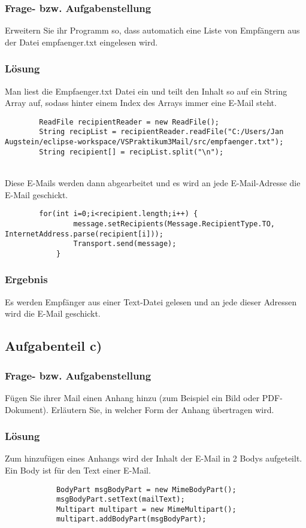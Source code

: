 \subsubsection{Frage- bzw. Aufgabenstellung}
 Erweitern Sie ihr Programm so, dass automatich eine Liste von Empfängern aus der Datei empfaenger.txt eingelesen wird.
 
\subsubsection{Lösung}
Man liest die Empfaenger.txt Datei ein und teilt den Inhalt so auf ein String Array auf, sodass hinter einem Index des Arrays immer eine E-Mail steht. 
\begin{lstlisting}
		ReadFile recipientReader = new ReadFile();
		String recipList = recipientReader.readFile("C:/Users/Jan Augstein/eclipse-workspace/VSPraktikum3Mail/src/empfaenger.txt");
		String recipient[] = recipList.split("\n");
\end{lstlisting} 
\\

Diese E-Mails werden dann abgearbeitet und es wird an jede E-Mail-Adresse die E-Mail geschickt.
\begin{lstlisting}
		for(int i=0;i<recipient.length;i++) {
				message.setRecipients(Message.RecipientType.TO, InternetAddress.parse(recipient[i]));
				Transport.send(message);
			}
\end{lstlisting}

\subsubsection{Ergebnis}
Es werden Empfänger aus einer Text-Datei gelesen und an jede dieser Adressen wird die E-Mail geschickt.

\subsection{Aufgabenteil c)}
\subsubsection{Frage- bzw. Aufgabenstellung}
 Fügen Sie ihrer Mail einen Anhang hinzu (zum Beispiel ein Bild oder PDF-Dokument). Erläutern Sie, in welcher Form der Anhang übertragen wird.

\subsubsection{Lösung}
Zum hinzufügen eines Anhangs wird der Inhalt der E-Mail in 2 Bodys aufgeteilt. Ein Body ist für den Text einer E-Mail.
\begin{lstlisting}
			BodyPart msgBodyPart = new MimeBodyPart();
			msgBodyPart.setText(mailText);
			Multipart multipart = new MimeMultipart();
			multipart.addBodyPart(msgBodyPart);
\end{lstlisting}
\\


